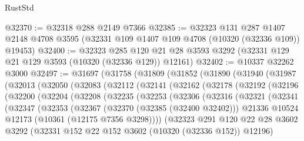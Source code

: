 \begin{lexlean}{RustStd}
\begin{coremodule}
@32370 := @32318 @288 @2149 @7366
@32385 := @32323
    @131
    @287
    @1407
    @2148
    @4708
    @3595
    (@32331 @109 @1407 @109 @4708 (@10320 (@32336 @109)) @19453)
@32400 := @32323
    @285
    @120
    @21
    @28
    @3593
    @3292
    (@32331 @129 @21 @129 @3593 (@10320 (@32336 @129)) @12161)
@32402 := @10337 @32262 @3000
@32497 := @31697
    (@31758
      (@31809
        (@31852
          (@31890
            (@31940
              (@31987
                (@32013
                  (@32050
                    (@32083
                      (@32112
                        (@32141
                          (@32162
                            (@32178
                              (@32192
                                (@32196
                                  (@32200
                                    (@32204
                                      (@32208
                                        (@32235
                                          (@32253
                                            (@32306
                                              (@32316
                                                (@32321
                                                  (@32341
                                                    (@32347
                                                      (@32353
                                                        (@32367
                                                          (@32370 (@32385 (@32400 @32402)))
                                                          @21336
                                                          @10524
                                                          @12173
                                                          (@10361 (@12175 @7356 @3298))))
                                                      (@32323
                                                        @291
                                                        @120
                                                        @22
                                                        @28
                                                        @3602
                                                        @3292
                                                        (@32331
                                                          @152
                                                          @22
                                                          @152
                                                          @3602
                                                          (@10320 (@32336 @152))
                                                          @12196)

\end{coremodule}
\end{lexlean}
